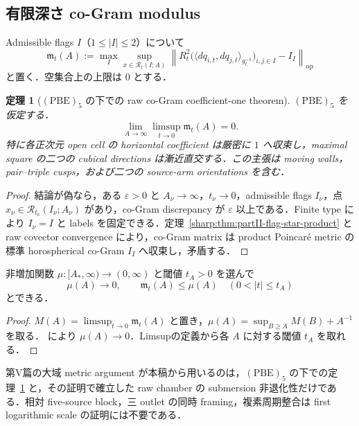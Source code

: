 \documentclass[a4paper,11pt]{ltjsarticle}
\numberwithin{equation}{section}
\theoremstyle{plain}
\newtheorem{theorem}{定理}[section]
\theoremstyle{definition}
\theoremstyle{remark}
\begin{document}
\subsection{有限深さ co-Gram modulus}
\begin{definition}\label{sharp:def:partII-raw-modulus}
Admissible flags $I$（$1\le|I|\le2$）について
\[
 \mathfrak m_t(A):=
 \max_I\sup_{x\in\mathcal R_t(I;A)}
 \left\|
 R_t^2\bigl(\langle dq_{i,t},dq_{j,t}\rangle_{g_t^{-1}}\bigr)_{i,j\in I}
 -I_I
 \right\|_{\mathrm{op}}
\]
と置く．空集合上の上限は $0$ とする．
\end{definition}

\begin{theorem}[$\mathrm{(PBE)}_5$ の下での raw co-Gram coefficient-one theorem]\label{sharp:thm:partII-raw-cogram}
$\mathrm{(PBE)}_5$ を仮定する．
\[
 \boxed{\displaystyle
 \lim_{A\to\infty}\limsup_{t\to0}\mathfrak m_t(A)=0.}
\]
特に各正次元 open cell の horizontal coefficient は厳密に $1$ へ収束し，maximal square の二つの cubical directions は漸近直交する．この主張は moving walls，pair--triple cusps，および二つの source-arm orientations を含む．
\end{theorem}

\begin{proof}
結論が偽なら，ある $\varepsilon>0$ と $A_\nu\to\infty$，$t_\nu\to0$，admissible flags $I_\nu$，点 $x_\nu\in\mathcal R_{t_\nu}(I_\nu;A_\nu)$ があり，co-Gram discrepancy が $\varepsilon$ 以上である．Finite type により $I_\nu=I$ と labels を固定できる．定理~\ref{sharp:thm:partII-flag-star-product} と raw covector convergence により，co-Gram matrix は product Poincaré metric の標準 horospherical co-Gram $I_I$ へ収束し，矛盾する．
\end{proof}

\begin{corollary}\label{sharp:cor:partII-uniform-modulus}
非増加関数 $\mu:[A_*,\infty)\to(0,\infty)$ と閾値 $t_A>0$ を選んで
\[
 \mu(A)\longrightarrow0,
 \qquad
 \mathfrak m_t(A)\le\mu(A)\quad(0<|t|\le t_A)
\]
とできる．
\end{corollary}

\begin{proof}
$M(A)=\limsup_{t\to0}\mathfrak m_t(A)$ と置き，$\mu(A)=\sup_{B\ge A}M(B)+A^{-1}$ を取る．
 により $\mu(A)\to0$．Limsupの定義から各 $A$ に対する閾値 $t_A$ を取れる．
\end{proof}

\begin{remark}\label{sharp:rem:partII-only-sharp-input}
第V篇の大域 metric argument が本稿から用いるのは，$\mathrm{(PBE)}_5$ の下での定理~\ref{sharp:thm:partII-raw-cogram} と，その証明で確立した raw chamber の submersion 非退化性だけである．相対 five-source block，三 outlet の同時 framing，複素周期整合は first logarithmic scale の証明には不要である．
\end{remark}
\end{document}
